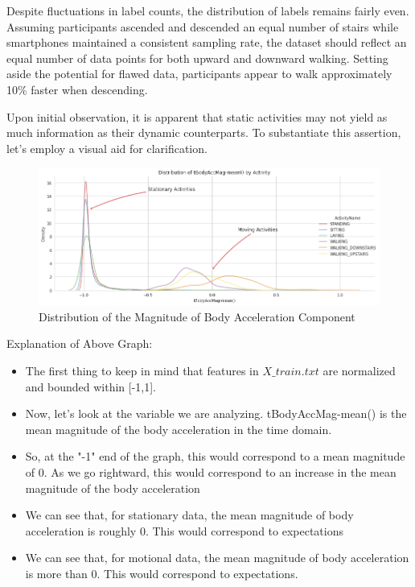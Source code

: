 \documentclass[11pt]{article}
\begin{document}
Despite fluctuations in label counts, the distribution of labels remains fairly even. Assuming participants ascended and descended an equal number of stairs while smartphones maintained a consistent sampling rate, the dataset should reflect an equal number of data points for both upward and downward walking. Setting aside the potential for flawed data, participants appear to walk approximately 10\% faster when descending. \newline 


Upon initial observation, it is apparent that static activities may not yield as much information as their dynamic counterparts. To substantiate this assertion, let's employ a visual aid for clarification. \newline 

\begin{figure}[h!]
	\includegraphics[width= 1.0 \linewidth]{distribution_acc_activity.png}
	\centering
	\caption{Distribution of the Magnitude of Body Acceleration Component}
	\label{distribution_acc_activity.png}
\end{figure}

Explanation of Above Graph: \newline 
\begin{itemize}
    \item The first thing to keep in mind that features in $X\_train.txt$ are normalized and bounded within [-1,1].
    \item Now, let's look at the variable we are analyzing. tBodyAccMag-mean() is the mean magnitude of the body acceleration in the time domain. 
    \item So, at the "-1" end of the graph, this would correspond to a mean magnitude of 0. As we go rightward, this would correspond to an increase in the  mean magnitude of the body acceleration
    \item We can see that, for stationary data, the mean magnitude of body acceleration is roughly 0. This would correspond to expectations
    \item We can see that, for motional data, the mean magnitude of body acceleration is more than 0. This would correspond to expectations. 
\end{itemize}
\end{document}
